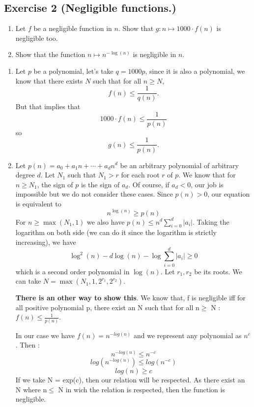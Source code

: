 \subsection{Exercise 2 (Negligible functions.)}
\begin{enumerate}
\item Let $f$ be a negligible function in $n$. Show that $g: n \mapsto
  1000\cdot f(n)$ is negligible too.
\item Show that the function $n \mapsto n^{-\log(n)}$ is negligible in $n$.
\end{enumerate}
\begin{solution}
  \begin{enumerate}
    \item Let $p$ be a polynomial,
      let's take $q = 1000p$,
      since it is also a polynomial, we know
      that there exists $N$ such that for all $n \geq N$,
      \[ f(n) \leq \frac{1}{q(n)}. \]
      But that implies that
      \[ 1000 \cdot f(n) \leq \frac{1}{p(n)} \]
      so
      \[ g(n) \leq \frac{1}{p(n)}. \]
    \item Let $p(n) = a_0 + a_1 n + \cdots + a_dn^d$ be an
      arbitrary polynomial of arbitrary degree $d$.
      Let $N_1$ such that $N_1 > r$ for each root $r$ of $p$.
      We know that for $n \geq N_1$, the sign of $p$ is the sign of $a_d$.
      Of course, if $a_d < 0$, our job is impossible but we do not consider these cases.
      Since $p(n) > 0$, our equation is equivalent to
      \[ n^{\log(n)} \geq p(n) \]
      For $n \geq \max(N_1,1)$ we also have
      $p(n) \leq n^d \sum_{i=0}^d|a_i|$.
      Taking the logarithm on both side (we can do it since the logarithm is strictly increasing),
      we have	%
      \[ \log^2(n) - d \log(n) - \log\sum_{i=0}^d|a_i| \geq 0 \]
      which is a second order polynomial in $\log(n)$.
      Let $r_1,r_2$ be its roots.
      We can take $N = \max(N_1,1,2^{r_1},2^{r_2})$.
      
      \textbf{There is an other way to show this}. We know that, f is negligible iff for all positive polynomial p, there exist an N such that for all n$\geq$ N : $ f(n) \leq \frac{1}{p(n)}$.
      
      In our case we have $f(n) = n^{-log(n)}$ and we represent any polynomial as $n^c$. Then : 
          $$n^{-log(n)} \leq n^{-c}$$
          $$log(n^{-log(n)}) \leq log(n^{-c})$$
          $$log(n) \geq c $$
      If we take N = exp(c), then our relation will be respected. As there exist an N where n$\leq$ N in wich the relation is respected, then the function is negligible. 
  \end{enumerate}
\end{solution}


